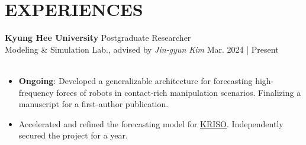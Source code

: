 \documentclass[a4paper,10pt]{extarticle}
\begin{document}


\section*{EXPERIENCES}
\noindent\textbf{Kyung Hee University} \hfill Postgraduate Researcher\\
Modeling \& Simulation Lab., advised by \textsl{Jin-gyun Kim} \hfill Mar. 2024 | Present\\
\vspace*{-0.25cm}\\
\begin{minipage}{0.78\textwidth}
	\footnotesize
	\begin{itemize}
		\item \textbf{Ongoing}: Developed a generalizable architecture for forecasting high-frequency forces of robots in contact-rich manipulation scenarios. Finalizing a manuscript for a first-author publication.
		\item Accelerated and refined the forecasting model for \href{https://www.kriso.re.kr/eng/}{\underline{KRISO}}. Independently secured the project for a year.
	\end{itemize}
\end{minipage}\\

\end{document}

